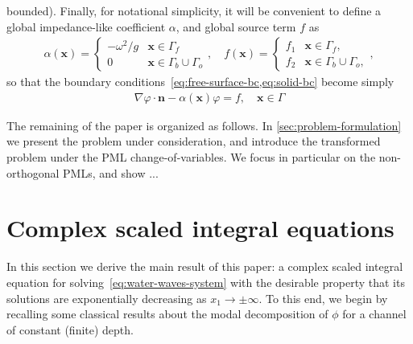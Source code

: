 \documentclass[11pt]{article}
\newcommand{\bn}{\mathbf{n}}
\newcommand{\bx}{\mathbf{x}}
\begin{document}
bounded). Finally, for notational simplicity, it will be convenient to define a
global impedance-like coefficient $\alpha$, and global source term $f$ as 
%
\begin{align}
  \label{eq:global-defs}  
  \alpha(\bx) = \begin{cases}
    -\omega^2/g  &\bx \in \Gamma_f\\
    0   &\bx \in \Gamma_b \cup \Gamma_o
  \end{cases}, \quad
  f(\bx) = \begin{cases}
    f_1  &\bx \in \Gamma_f,\\
    f_2  &\bx \in \Gamma_b \cup \Gamma_o,
  \end{cases}, 
\end{align}
% 
so that the boundary conditions~\cref{eq:free-surface-bc,eq:solid-bc} become simply
%
\begin{align}
  \label{eq:global-bc}  
  \nabla \varphi \cdot \bn - \alpha(\bx) \varphi = f, \quad \bx \in \Gamma
\end{align}
%

The remaining of the paper is organized as follows. In
\cref{sec:problem-formulation} we present the problem under consideration, and
introduce the transformed problem under the PML change-of-variables. We focus in
particular on the non-orthogonal PMLs, and show ...

\section{Complex scaled integral equations}

In this section we derive the main result of this paper: a complex scaled
integral equation for solving~\cref{eq:water-waves-system} with the desirable
property that its solutions are exponentially decreasing as $x_1 \to \pm
\infty$. To this end, we begin by recalling some classical results about the
modal decomposition of $\phi$ for a channel of constant (finite) depth. 
\end{document}
